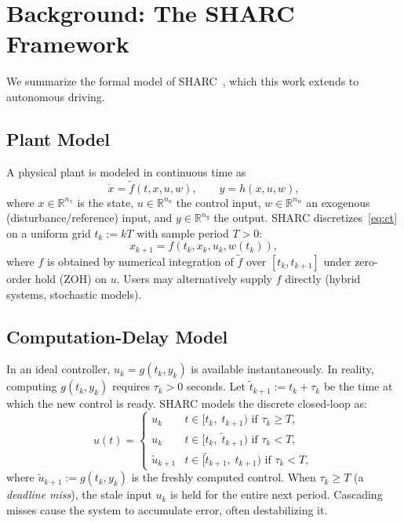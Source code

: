 \documentclass[conference]{IEEEtran}
\newcommand{\R}{\mathbb{R}}
\begin{document}
\section{Background: The SHARC Framework}\label{sec:sharc}

We summarize the formal model of SHARC~\cite{wintz2025sharc}, which
this work extends to autonomous driving.

\subsection{Plant Model}

A physical plant is modeled in continuous time as
\begin{equation}\label{eq:ct}
  \dot{x} = \tilde{f}(t, x, u, w), \qquad y = h(x, u, w),
\end{equation}
where $x \in \R^{n_x}$ is the state, $u \in \R^{n_u}$ the control
input, $w \in \R^{n_w}$ an exogenous (disturbance/reference) input, and
$y \in \R^{n_y}$ the output.  SHARC discretizes~\eqref{eq:ct} on a
uniform grid $t_k := kT$ with sample period $T > 0$:
\begin{equation}\label{eq:disc}
  x_{k+1} = f(t_k, x_k, u_k, w(t_k)),
\end{equation}
where $f$ is obtained by numerical integration of $\tilde{f}$ over
$[t_k, t_{k+1}]$ under zero-order hold (ZOH) on $u$.  Users may
alternatively supply $f$ directly (hybrid systems, stochastic models).

\subsection{Computation-Delay Model}\label{sec:delay}

In an ideal controller, $u_k = g(t_k, y_k)$ is available
instantaneously.  In reality, computing $g(t_k, y_k)$ requires
$\tau_k > 0$ seconds.  Let $\tilde{t}_{k+1} := t_k + \tau_k$ be the
time at which the new control is ready.  SHARC models the discrete
closed-loop as:
\begin{equation}\label{eq:zoh_delay}
  u(t) = \begin{cases}
    u_k & t \in [t_k,\; t_{k+1}) \text{ if } \tau_k \geq T, \\
    u_k & t \in [t_k,\; \tilde{t}_{k+1}) \text{ if } \tau_k < T, \\
    \tilde{u}_{k+1} & t \in [\tilde{t}_{k+1},\; t_{k+1}) \text{ if }
    \tau_k < T,
  \end{cases}
\end{equation}
where $\tilde{u}_{k+1} := g(t_k, y_k)$ is the freshly computed control.
When $\tau_k \geq T$ (a \emph{deadline miss}), the stale input $u_k$
is held for the entire next period.  Cascading misses cause the system
to accumulate error, often destabilizing it.
\end{document}
